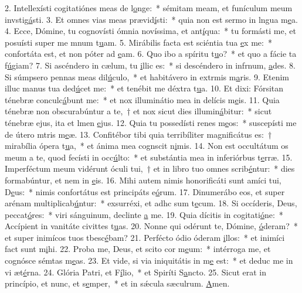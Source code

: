 2. Intellexísti cogitatiónes meas de l\uline{o}nge:~* sémitam meam, et funículum meum invstig\uline{á}sti.
3. Et omnes vias meas prævid\uline{í}sti:~* quia non est sermo in lngua m\uline{e}a.
4. Ecce, Dómine, tu cognovísti ómnia novíssima, et ant\uline{í}qua:~* tu formásti me, et posuísti super me mnum t\uline{u}am.
5. Mirábilis facta est sciéntia tua \uline{e}x me:~* confortáta est, et non póter ad \uline{e}am.
6. Quo ibo a spíritu t\uline{u}o?~* et quo a fácie ta f\uline{ú}giam?
7. Si ascéndero in cælum, tu \uline{i}llic es:~* si descéndero in infrnum, \uline{a}des.
8. Si súmpsero pennas meas dil\uline{ú}culo,~* et habitávero in extrmis m\uline{a}ris.
9. Etenim illuc manus tua ded\uline{ú}cet me:~* et tenébit me déxtra t\uline{u}a.
10. Et dixi: Fórsitan ténebræ conculc\uline{á}bunt me:~* et nox illuminátio mea in delícis m\uline{e}is.
11. Quia ténebræ non obscurabúntur a te,~† et nox sicut dies illumin\uline{á}bitur:~* sicut ténebræ ejus, ita et lmen \uline{e}jus.
12. Quia tu possedísti renes m\uline{e}os:~* suscepísti me de útero mtris m\uline{e}æ.
13. Confitébor tibi quia terribíliter magnificátus es:~† mirabília ópera t\uline{u}a,~* et ánima mea cognscit n\uline{i}mis.
14. Non est occultátum os meum a te, quod fecísti in occ\uline{ú}lto:~* et substántia mea in inferiórbus t\uline{e}rræ.
15. Imperféctum meum vidérunt óculi tui,~† et in libro tuo omnes scrib\uline{é}ntur:~* dies formabúntur, et nem in \uline{e}is.
16. Mihi autem nimis honorificáti sunt amíci tui, D\uline{e}us:~* nimis confortátus est principáts e\uline{ó}rum.
17. Dinumerábo eos, et super arénam multiplicab\uline{ú}ntur:~* exsurréxi, et adhc sum t\uline{e}cum.
18. Si occíderis, Deus, peccat\uline{ó}res:~* viri sánguinum, declinte \uline{a} me.
19. Quia dícitis in cogitati\uline{ó}ne:~* Accípient in vanitáte civittes t\uline{u}as.
20. Nonne qui odérunt te, Dómine, \uline{ó}deram?~* et super inimícos tuos tbesc\uline{é}bam?
21. Perfécto ódio óderam \uline{i}llos:~* et inimíci fact sunt m\uline{i}hi.
22. Proba me, Deus, et scito cor m\uline{e}um:~* intérroga me, et cognósce sémtas m\uline{e}as.
23. Et vide, si via iniquitátis in m\uline{e} est:~* et deduc me in vi æt\uline{é}rna.
24. Glória Patri, et F\uline{í}lio,~* et Spiríti S\uline{a}ncto.
25. Sicut erat in princípio, et nunc, et s\uline{e}mper,~* et in sǽcula sæculrum. \uline{A}men.

